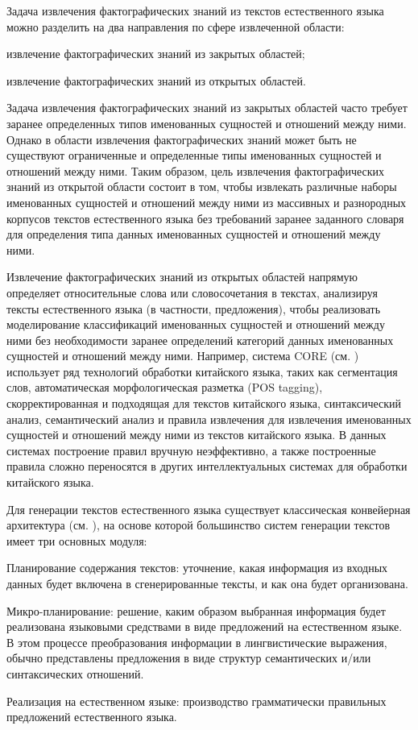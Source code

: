 Задача извлечения фактографических знаний из текстов естественного языка можно разделить на два направления по сфере извлеченной области:
\begin{textitemize}
	\item извлечение фактографических знаний из закрытых областей;
	\item извлечение фактографических знаний из открытых областей.
\end{textitemize}

Задача извлечения фактографических знаний из закрытых областей часто требует заранее определенных типов именованных сущностей и отношений между ними. Однако в области извлечения фактографических знаний может быть не существуют ограниченные и определенные типы именованных сущностей и отношений между ними. Таким образом, цель извлечения фактографических знаний из открытой области состоит в том, чтобы извлекать различные наборы именованных сущностей и отношений между ними из массивных и разнородных корпусов текстов естественного языка без требований заранее заданного словаря для определения типа данных именованных сущностей и отношений между ними.

Извлечение фактографических знаний из открытых областей напрямую определяет относительные слова или словосочетания в текстах, анализируя тексты естественного языка (в частности, предложения), чтобы реализовать моделирование классификаций именованных сущностей и отношений между ними без необходимости заранее определений категорий данных именованных сущностей и отношений между ними.  Например, система CORE (см. ) использует ряд технологий обработки китайского языка, таких как сегментация слов, автоматическая морфологическая разметка (POS tagging), скорректированная и подходящая для текстов китайского языка, синтаксический анализ, семантический анализ и правила извлечения для извлечения именованных сущностей и отношений между ними из текстов китайского языка. В данных системах построение правил вручную неэффективно, а также построенные правила сложно переносятся в других интеллектуальных системах для обработки китайского языка.

Для генерации текстов естественного языка существует классическая конвейерная архитектура (см. ), на основе которой большинство систем генерации текстов имеет три основных модуля:
\begin{textitemize}
	\item Планирование содержания текстов: уточнение, какая информация из входных данных будет включена в сгенерированные тексты, и как она будет организована.
	\item Микро-планирование: решение, каким образом выбранная информация будет реализована языковыми средствами в виде предложений на естественном языке. В этом процессе преобразования информации в лингвистические выражения, обычно представлены предложения в виде структур семантических и/или синтаксических отношений.
	\item Реализация на естественном языке: производство грамматически правильных предложений естественного языка.
\end{textitemize}

